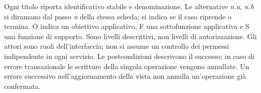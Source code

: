 \newcommand{\scheda}[7]{%
  \subsection{\texorpdfstring{\raggedright #1 --- #2}{#1 --- #2}}\label{uc:#1}
  \begin{longtable}{|p{.20\linewidth}|p{.72\linewidth}|}
  \caption{Scheda del caso d'uso #1}\\\hline
  \textbf{Campo} & \textbf{Contenuto}\\\hline\endfirsthead
  \textbf{Campo} & \textbf{Contenuto (continua)}\\\hline\endhead
  Identificativo & #1\\\hline
  Descrizione & #3\\\hline
  Livello & #4\\\hline
  Attori & #5\\\hline
  Precondizioni & #6\\\hline
  Postcondizioni & #7\\\hline
  \end{longtable}
}
\newcommand{\principale}{\paragraph{Flusso principale}}
\newcommand{\alternative}{\paragraph{Alternative}}

Ogni titolo riporta identificativo stabile e denominazione. Le alternative
\emph{n.a}, \emph{n.b} si diramano dal passo \emph{n} della stessa scheda;
si indica se il caso riprende o termina. O indica un obiettivo applicativo,
F una sottofunzione applicativa e S una funzione di supporto. Sono livelli
descrittivi, non livelli di autorizzazione. Gli attori sono ruoli dell'interfaccia;
non si assume un controllo dei permessi indipendente in ogni servizio.
Le postcondizioni descrivono il successo; in caso di errore transazionale
le scritture della singola operazione vengono annullate. Un errore successivo
nell'aggiornamento della vista non annulla un'operazione gi\`a confermata.


